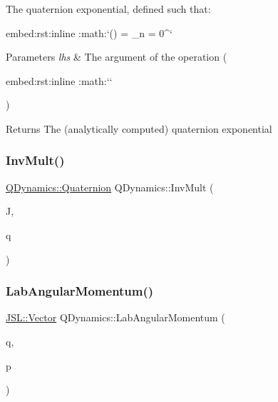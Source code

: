 The quaternion exponential, defined such that\+: 

\begin{DoxyVerb}embed:rst:inline :math:`\exp() = \sum_{n = 0}^\infty {}` \end{DoxyVerb}
 
\begin{DoxyParams}{Parameters}
{\em lhs} & The argument of the operation (\begin{DoxyVerb}embed:rst:inline :math:`` \end{DoxyVerb}
) \\
\hline
\end{DoxyParams}
\begin{DoxyReturn}{Returns}
The (analytically computed) quaternion exponential 
\end{DoxyReturn}
\mbox{\label{namespaceQDynamics_a78137919461ac257fe032f870771b0ed}} 
\subsubsection{\texorpdfstring{Inv\+Mult()}{InvMult()}}
{\footnotesize\ttfamily \hyperlink{classQDynamics_1_1Quaternion}{Q\+Dynamics\+::\+Quaternion} Q\+Dynamics\+::\+Inv\+Mult (\begin{DoxyParamCaption}\item[{const \hyperlink{classJSL_1_1Vector}{J\+S\+L\+::\+Vector} \&}]{J,  }\item[{const \hyperlink{classQDynamics_1_1Quaternion}{Q\+Dynamics\+::\+Quaternion} \&}]{q }\end{DoxyParamCaption})}

\mbox{\label{namespaceQDynamics_a4eabde69f542fcca92f97b1ef2e28b33}} 
\subsubsection{\texorpdfstring{Lab\+Angular\+Momentum()}{LabAngularMomentum()}}
{\footnotesize\ttfamily \hyperlink{classJSL_1_1Vector}{J\+S\+L\+::\+Vector} Q\+Dynamics\+::\+Lab\+Angular\+Momentum (\begin{DoxyParamCaption}\item[{const \hyperlink{classQDynamics_1_1Quaternion}{Q\+Dynamics\+::\+Quaternion} \&}]{q,  }\item[{const \hyperlink{classQDynamics_1_1Quaternion}{Q\+Dynamics\+::\+Quaternion} \&}]{p }\end{DoxyParamCaption})}

